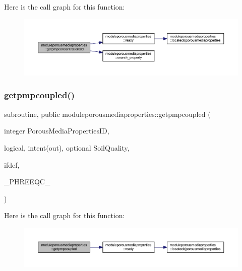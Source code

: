 Here is the call graph for this function\+:\nopagebreak
\begin{figure}[H]
\begin{center}
\leavevmode
\includegraphics[width=350pt]{namespacemoduleporousmediaproperties_aad77475234f116fbce60ab8837dfd9e9_cgraph}
\end{center}
\end{figure}
\mbox{\label{namespacemoduleporousmediaproperties_acf31c9d94d5dc07a5b27c954a6895abb}} 
\subsubsection{\texorpdfstring{getpmpcoupled()}{getpmpcoupled()}}
{\footnotesize\ttfamily subroutine, public moduleporousmediaproperties\+::getpmpcoupled (\begin{DoxyParamCaption}\item[{integer}]{Porous\+Media\+Properties\+ID,  }\item[{logical, intent(out), optional}]{Soil\+Quality,  }\item[{}]{ifdef,  }\item[{}]{\+\_\+\+P\+H\+R\+E\+E\+Q\+C\+\_\+ }\end{DoxyParamCaption})}

Here is the call graph for this function\+:\nopagebreak
\begin{figure}[H]
\begin{center}
\leavevmode
\includegraphics[width=350pt]{namespacemoduleporousmediaproperties_acf31c9d94d5dc07a5b27c954a6895abb_cgraph}
\end{center}
\end{figure}
\mbox{\label{namespacemoduleporousmediaproperties_aa5824bb6f506f737243ff62a77a6d38c}} 
